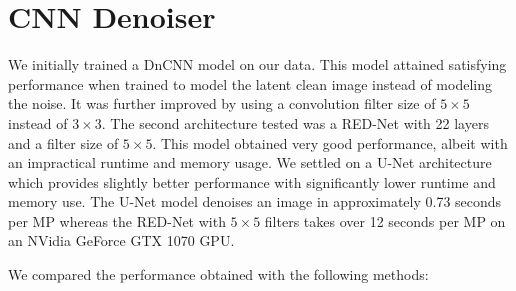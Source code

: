 \section{CNN Denoiser}\label{sec:CNN Denoiser}
We initially trained a DnCNN \cite{dncnn} model on our data. This model attained satisfying performance when trained to model the latent clean image instead of modeling the noise. It was further improved by using a convolution filter size of $5\times 5$ instead of $3\times 3$. The second architecture tested was a \ac{RED-Net} \cite{rednet} with 22 layers and a filter size of $5\times 5$. This model obtained very good performance, albeit with an impractical runtime and memory usage. We settled on a U-Net \cite{unet} architecture which provides slightly better performance with significantly lower runtime and memory use. The U-Net model denoises an image in approximately 0.73 seconds per \ac{MP} whereas the \ac{RED-Net} with $5 \times 5$ filters takes over 12 seconds per \ac{MP} on an NVidia GeForce GTX 1070 \ac{GPU}.


We compared the performance obtained with the following methods:

